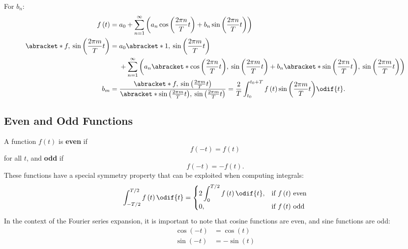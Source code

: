 \documentclass{article}
\begin{document}
For \(b_n\):
\begin{align*}
    f\left( t \right)                                        & = a_0 + \sum_{n=1}^{\infty} \left( a_n \cos{\left( \frac{2\pi n}{T} t \right)} + b_n \sin{\left( \frac{2\pi n}{T} t \right)} \right)                                                                                                                                     \\
    \abracket*{f,\: \sin{\left( \frac{2\pi m}{T} t \right)}} & =
    \begin{aligned}[t]
         & a_0 \abracket*{1,\: \sin{\left( \frac{2\pi m}{T} t \right)}}                                                                                                                                                                                 \\
         & + \sum_{n=1}^{\infty} \left( a_n \abracket*{\cos{\left( \frac{2\pi n}{T} t \right)},\: \sin{\left( \frac{2\pi m}{T} t \right)}} + b_n \abracket*{\sin{\left( \frac{2\pi n}{T} t \right)},\: \sin{\left( \frac{2\pi m}{T} t \right)}} \right)
    \end{aligned}
    \\
    b_m                                                      & = \frac{\abracket*{f,\: \sin{\left( \frac{2\pi m}{T} t \right)}}}{\abracket*{\sin{\left( \frac{2\pi m}{T} t \right)},\: \sin{\left( \frac{2\pi m}{T} t \right)}}} = \frac{2}{T} \int_{t_0}^{t_0 + T} f\left( t \right) \sin{\left( \frac{2\pi m}{T} t \right)} \odif{t}.
\end{align*}
\subsection{Even and Odd Functions}
A function \(f\left( t \right)\) is \textbf{even} if
\begin{equation*}
    f\left( -t \right) = f\left( t \right)
\end{equation*}
for all \(t\), and \textbf{odd} if
\begin{equation*}
    f\left( -t \right) = -f\left( t \right).
\end{equation*}
These functions have a special symmetry property that can be exploited
when computing integrals:
\begin{equation*}
    \int_{-T/2}^{T/2} f\left( t \right) \odif{t} =
    \begin{cases}
        2 \displaystyle\int_{0}^{T/2} f\left( t \right) \odif{t}, & \text{if \(f\left( t \right)\) even} \\
        0,                                                        & \text{if \(f\left( t \right)\) odd}
    \end{cases}
\end{equation*}
In the context of the Fourier series expansion, it is important to note
that cosine functions are even, and sine functions are odd:
\begin{align*}
    \cos{\left( -t \right)} & = \cos{\left( t \right)}  \\
    \sin{\left( -t \right)} & = -\sin{\left( t \right)}
\end{align*}
\end{document}
